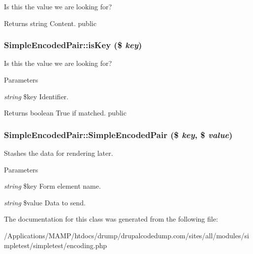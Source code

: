 \label{class_simple_encoded_pair_aa4061b82a5741fef9824ddaeb3ccfb9d}
Is this the value we are looking for? \begin{DoxyReturn}{Returns}
string Content.  public 
\end{DoxyReturn}
\hypertarget{class_simple_encoded_pair_acf18455c43450b58f3d4c71e455fab8e}{
\subsubsection[{isKey}]{\setlength{\rightskip}{0pt plus 5cm}SimpleEncodedPair::isKey (\$ {\em key})}}
\label{class_simple_encoded_pair_acf18455c43450b58f3d4c71e455fab8e}
Is this the value we are looking for? 
\begin{DoxyParams}{Parameters}
\item[{\em string}]\$key Identifier. \end{DoxyParams}
\begin{DoxyReturn}{Returns}
boolean True if matched.  public 
\end{DoxyReturn}
\hypertarget{class_simple_encoded_pair_a99be530ce760f7b3ef39fdab4f3e52b1}{
\subsubsection[{SimpleEncodedPair}]{\setlength{\rightskip}{0pt plus 5cm}SimpleEncodedPair::SimpleEncodedPair (\$ {\em key}, \/  \$ {\em value})}}
\label{class_simple_encoded_pair_a99be530ce760f7b3ef39fdab4f3e52b1}
Stashes the data for rendering later. 
\begin{DoxyParams}{Parameters}
\item[{\em string}]\$key Form element name. \item[{\em string}]\$value Data to send. \end{DoxyParams}


The documentation for this class was generated from the following file:\begin{DoxyCompactItemize}
\item 
/Applications/MAMP/htdocs/drump/drupalcodedump.com/sites/all/modules/simpletest/simpletest/encoding.php\end{DoxyCompactItemize}

